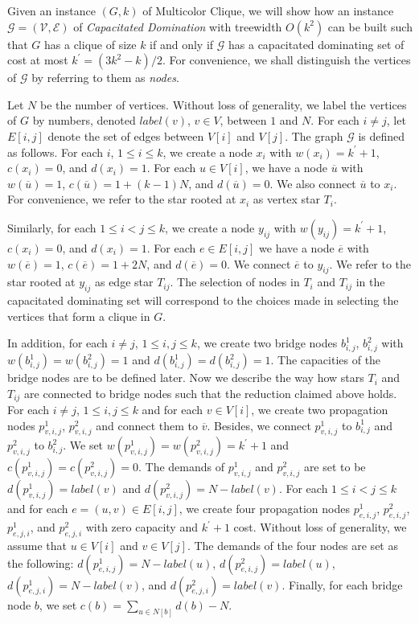 \documentclass[a4paper,11pt]{article}
\theoremstyle{definition}
\newcommand{\G}{\mathcal G}
\newcommand{\V}{\mathcal V}
\newcommand{\E}{\mathcal E}
\begin{document}
Given an instance $(G,k)$ of {\sc Multicolor Clique}, we will show how an instance $\G=(\V,\E)$ of {\em Capacitated Domination} with treewidth $O(k^2)$ can be built such that $G$ has a clique of size $k$ if and only if $\G$ has a capacitated dominating set of cost at most $k^\prime=(3k^2-k)/2$. For convenience, we shall distinguish the vertices of $\G$ by referring to them as {\em nodes}.

\smallskip

Let $N$ be the number of vertices. Without loss of generality, we label the vertices of $G$ by numbers, denoted $label(v)$, $v \in V$, between $1$ and $N$. For each $i\ne j$, let $E[i,j]$ denote the set of edges between $V[i]$ and $V[j]$. The graph $\G$ is defined as follows. For each $i$, $1\le i \le k$, we create a node $x_i$ with $w(x_i) = k^\prime+1$, $c(x_i) = 0$, and $d(x_i) = 1$. For each $u \in V[i]$, we have a node $\overline{u}$ with $w(\overline{u}) = 1$, $c(\overline{u}) = 1+(k-1)N$, and $d(\overline{u}) = 0$. We also connect $\overline{u}$ to $x_i$. For convenience, we refer to the star rooted at $x_i$ as vertex star $T_i$. 

\smallskip

Similarly, for each $1\le i<j\le k$, we create a node $y_{ij}$ with $w(y_{ij}) = k^\prime+1$, $c(x_i) = 0$, and $d(x_i) = 1$. For each $e\in E[i,j]$ we have a node $\overline{e}$ with $w(\overline{e}) = 1$, $c(\overline{e}) = 1+2N$, and $d(\overline{e}) = 0$. We connect $\overline{e}$ to $y_{ij}$. We refer to the star rooted at $y_{ij}$ as edge star $T_{ij}$. The selection of nodes in $T_i$ and $T_{ij}$ in the capacitated dominating set will correspond to the choices made in selecting the vertices that form a clique in $G$.

\smallskip

In addition, for each $i\ne j$, $1 \le i,j \le k$, we create two bridge nodes $b^1_{i,j}$, $b^2_{i,j}$ with $w(b^1_{i,j}) = w(b^2_{i,j}) = 1$ and $d(b^1_{i,j}) = d(b^2_{i,j}) = 1$. The capacities of the bridge nodes are to be defined later. Now we describe the way how stars $T_i$ and $T_{ij}$ are connected to bridge nodes such that the reduction claimed above holds. For each $i\ne j$, $1 \le i,j \le k$ and for each $v \in V[i]$, 
we create two propagation nodes $p^1_{v,i,j}$, $p^2_{v,i,j}$ and connect them to $\overline{v}$. Besides, we connect $p^1_{v,i,j}$ to $b^1_{i,j}$ and $p^2_{v,i,j}$ to $b^2_{i,j}$. We set $w(p^1_{v,i,j}) = w(p^2_{v,i,j}) = k^\prime+1$ and $c(p^1_{v,i,j}) = c(p^2_{v,i,j}) = 0$. The demands of $p^1_{v,i,j}$ and $p^2_{v,i,j}$ are set to be $d(p^1_{v,i,j}) = label(v)$ and $d(p^2_{v,i,j}) = N - label(v)$. For each $1 \le i<j\le k$ and for each $e = (u,v) \in E[i,j]$, we create four propagation nodes $p^1_{e,i,j}$, $p^2_{e,i,j}$, $p^1_{e,j,i}$, and $p^2_{e,j,i}$ with zero capacity and $k^\prime+1$ cost. Without loss of generality, we assume that $u \in V[i]$ and $v \in V[j]$. The demands of the four nodes are set as the following: $d(p^1_{e,i,j}) = N-label(u)$, $d(p^2_{e,i,j}) = label(u)$, $d(p^1_{e,j,i}) = N-label(v)$, and $d(p^2_{e,j,i}) = label(v)$. 
Finally, for each bridge node $b$, we set $c(b) = \sum_{u \in N[b]}d(b) - N$.
\end{document}
